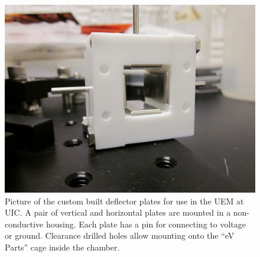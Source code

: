 \begin{figure}
  \centering
  \includegraphics{deflector_plates.jpg}
  \caption[Picture of custom deflector plates]{
    Picture of the custom built deflector plates for use in the UEM at UIC.
    A pair of vertical and horizontal plates are mounted in a non-conductive housing.
    Each plate has a pin for connecting to voltage or ground.
    Clearance drilled holes allow mounting onto the ``eV Parts'' cage inside the chamber.
  }
  \label{fig:deflector-plates-pic}
\end{figure}
